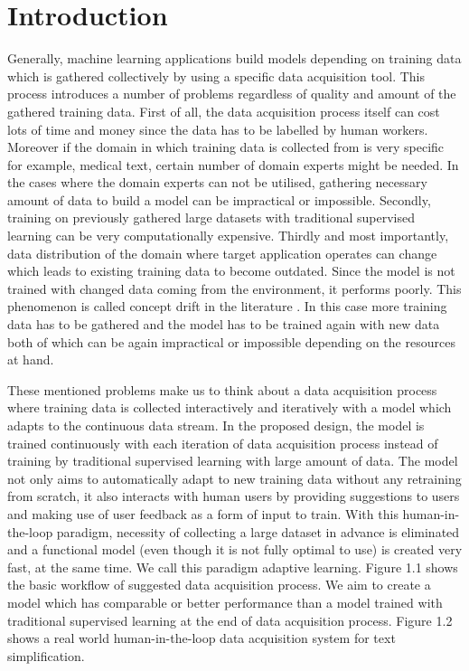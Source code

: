 \chapter{Introduction}\label{introduction}

Generally, machine learning applications build models depending on training data which is gathered collectively by using a specific data acquisition tool. This process introduces a number of problems regardless of quality and amount of the gathered training data. First of all, the data acquisition process itself can cost lots of time and money since the data has to be labelled by human workers. Moreover if the domain in which training data is collected from is very specific for example, medical text, certain number of domain experts might be needed. In the cases where the domain experts can not be utilised, gathering necessary amount of data to build a model can be impractical or impossible. Secondly, training on previously gathered large datasets with traditional supervised learning can be very computationally expensive. Thirdly and most importantly, data distribution of the domain where target application operates can change which leads to existing training data to become outdated. Since the model is not trained with changed data coming from the environment, it performs poorly. This phenomenon is called concept drift in the literature \cite{concept}. In this case more training data has to be gathered and the model has to be trained again with new data both of which can be again impractical or impossible depending on the resources at hand.

These mentioned problems make us to think about a data acquisition process where training data is collected interactively and iteratively with a model which adapts to the continuous data stream. In the proposed design, the model is trained continuously with each iteration of data acquisition process instead of training by traditional supervised learning with large amount of data. The model not only aims to automatically adapt to new training data without any retraining from scratch, it also interacts with human users by providing suggestions to users and making use of user feedback as a form of input to train. With this human-in-the-loop paradigm, necessity of collecting a large dataset in advance is eliminated and a functional model (even though it is not fully optimal to use) is created very fast, at the same time. We call this paradigm adaptive learning. Figure 1.1 shows the basic workflow of suggested data acquisition process. We aim to create a model which has comparable or better performance than a model trained with traditional supervised learning at the end of data acquisition process. Figure 1.2 shows a real world human-in-the-loop data acquisition system for text simplification.

